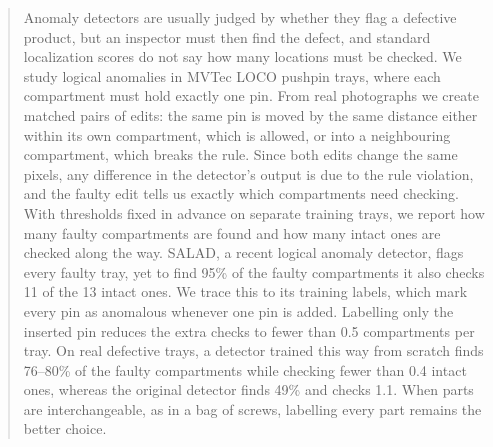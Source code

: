 \begin{abstract}
Anomaly detectors are usually judged by whether they flag a defective product, but an inspector must then find the defect, and standard localization scores do not say how many locations must be checked. We study logical anomalies in MVTec LOCO pushpin trays, where each compartment must hold exactly one pin. From real photographs we create matched pairs of edits: the same pin is moved by the same distance either within its own compartment, which is allowed, or into a neighbouring compartment, which breaks the rule. Since both edits change the same pixels, any difference in the detector's output is due to the rule violation, and the faulty edit tells us exactly which compartments need checking. With thresholds fixed in advance on separate training trays, we report how many faulty compartments are found and how many intact ones are checked along the way. SALAD, a recent logical anomaly detector, flags every faulty tray, yet to find 95\% of the faulty compartments it also checks 11 of the 13 intact ones. We trace this to its training labels, which mark every pin as anomalous whenever one pin is added. Labelling only the inserted pin reduces the extra checks to fewer than 0.5 compartments per tray. On real defective trays, a detector trained this way from scratch finds 76--80\% of the faulty compartments while checking fewer than 0.4 intact ones, whereas the original detector finds 49\% and checks 1.1. When parts are interchangeable, as in a bag of screws, labelling every part remains the better choice.
\end{abstract}
